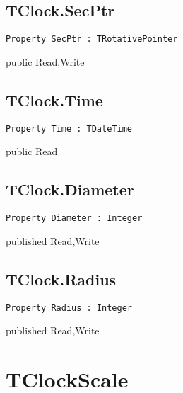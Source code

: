 \subsection{TClock.SecPtr}
\label{hmi:retroclock:tclock:secptr}
\begin{FPCList}
\Declaration 

\begin{verbatim}
Property SecPtr : TRotativePointer
\end{verbatim}
\Visibility
public
\Access
Read,Write
\end{FPCList}
\subsection{TClock.Time}
\label{hmi:retroclock:tclock:time}
\begin{FPCList}
\Declaration 

\begin{verbatim}
Property Time : TDateTime
\end{verbatim}
\Visibility
public
\Access
Read
\end{FPCList}
\subsection{TClock.Diameter}
\label{hmi:retroclock:tclock:diameter}
\begin{FPCList}
\Declaration 

\begin{verbatim}
Property Diameter : Integer
\end{verbatim}
\Visibility
published
\Access
Read,Write
\end{FPCList}
\subsection{TClock.Radius}
\label{hmi:retroclock:tclock:radius}
\begin{FPCList}
\Declaration 

\begin{verbatim}
Property Radius : Integer
\end{verbatim}
\Visibility
published
\Access
Read,Write
\end{FPCList}
\section{TClockScale}
\label{hmi:retroclock:tclockscale}
